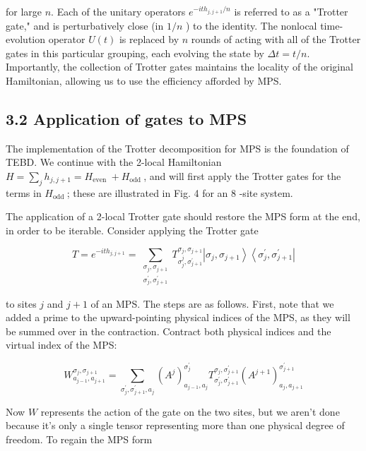 \documentclass[12pt]{article}
\begin{document}
for large $n$. Each of the unitary operators $e^{-i t h_{j, j+1} / n}$ is referred to as a "Trotter gate," and is perturbatively close (in $1 / n$ ) to the identity. The nonlocal time-evolution operator $U(t)$ is replaced by $n$ rounds of acting with all of the Trotter gates in this particular grouping, each evolving the state by $\Delta t=t / n$. Importantly, the collection of Trotter gates maintains the locality of the original Hamiltonian, allowing us to use the efficiency afforded by MPS.

\subsection*{3.2 Application of gates to MPS}
The implementation of the Trotter decomposition for MPS is the foundation of TEBD. We continue with the 2-local Hamiltonian $H=\sum_{j} h_{j, j+1}=H_{\text {even }}+H_{\text {odd }}$, and will first apply the Trotter gates for the terms in $H_{\text {odd }}$; these are illustrated in Fig. 4 for an 8 -site system.

The application of a 2-local Trotter gate should restore the MPS form at the end, in order to be iterable. Consider applying the Trotter gate


\begin{equation*}
T=e^{-i t h_{j, j+1}}=\sum_{\substack{\sigma_{j}, \sigma_{j+1} \\ \sigma_{j}^{\prime}, \sigma_{j+1}^{\prime}}} T_{\sigma_{j}^{j}, \sigma_{j+1}^{\prime}}^{\sigma_{j}, \sigma_{j+1}}\left|\sigma_{j}, \sigma_{j+1}\right\rangle\left\langle\sigma_{j}^{\prime}, \sigma_{j+1}^{\prime}\right| \tag{12}
\end{equation*}


to sites $j$ and $j+1$ of an MPS. The steps are as follows. First, note that we added a prime to the upward-pointing physical indices of the MPS, as they will be summed over in the contraction. Contract both physical indices and the virtual index of the MPS:


\begin{equation*}
W_{a_{j-1}, a_{j+1}}^{\sigma_{j}, \sigma_{j+1}}=\sum_{\sigma_{j}^{\prime}, \sigma_{j+1}^{\prime}, a_{j}}\left(A^{j}\right)_{a_{j-1}, a_{j}}^{\sigma_{j}^{\prime}} T_{\sigma_{j}^{\prime}, \sigma_{j+1}^{\prime}}^{\sigma_{j}, \sigma_{j+1}^{\prime}}\left(A^{j+1}\right)_{a_{j}, a_{j+1}}^{\sigma_{j+1}^{\prime}} \tag{13}
\end{equation*}


Now $W$ represents the action of the gate on the two sites, but we aren't done because it's only a single tensor representing more than one physical degree of freedom. To regain the MPS form
\end{document}

